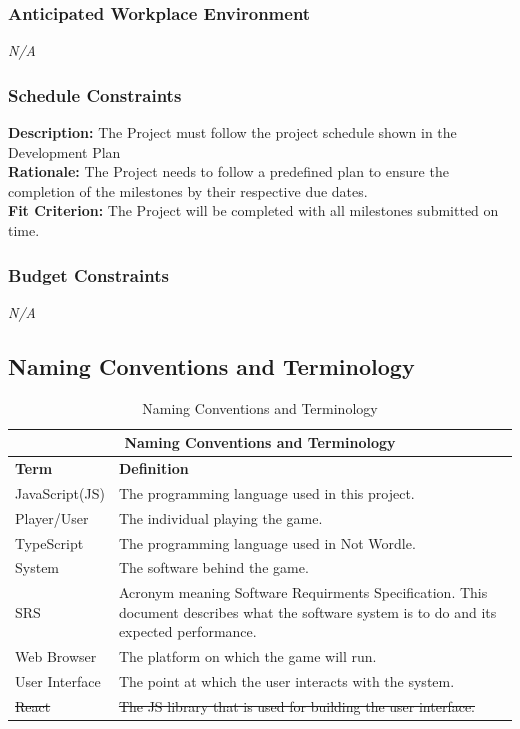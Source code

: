 \documentclass[12pt, titlepage]{article}
\begin{document}
	\subsubsection{Anticipated Workplace Environment}
	\noindent \emph{N/A}
	
	\subsubsection{Schedule Constraints}
	\noindent \textbf{Description:} The Project must follow the project 
	schedule shown in the Development Plan\\
	\textbf{Rationale:} The Project needs to follow a predefined plan 
	to ensure the completion of the milestones by their respective due dates. \\
	\textbf{Fit Criterion:} The Project will be completed with all milestones 
	submitted on time. 
	
	\subsubsection{Budget Constraints}
	\noindent \emph{N/A}
	
	\newpage
	\subsection{Naming Conventions and Terminology}
	\begin{table}[h!]
		\caption{Naming Conventions and Terminology}
		\begin{tabular}{ |p{6cm}|p{8cm}|  }
			\hline
			\multicolumn{2}{|c|}{Naming Conventions and Terminology} \\
			\hline
			\textbf{Term} & \textbf{Definition}\\
			\hline
			JavaScript(JS) & The programming language used in this project.  \\
			\hline
			Player/User & The individual playing the game.   \\
			\hline
			TypeScript & The programming language used in Not Wordle.  \\
			\hline
			System    & The software behind the game.  \\
			\hline 
			SRS & Acronym meaning Software Requirments Specification. This 
			document 
			describes what the software system is to do and its expected 
			performance.   \\
			\hline
			Web Browser & The platform on which the game will run. \\
			\hline
			User Interface & The point at which the user interacts with the 
			system.  \\
			\hline
			\st{React} & \st{The JS library that is used for building the user 
			interface.}  \\
			\hline
		\end{tabular}
	\end{table}
	
\end{document}

